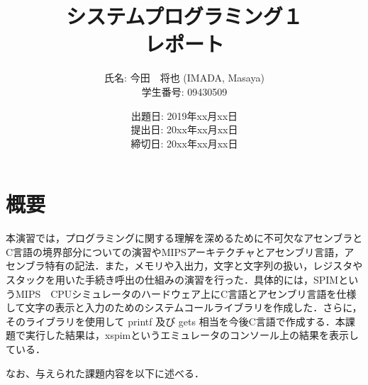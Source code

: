 \documentclass[a4j,11pt]{jarticle}
\title{システムプログラミング１ \\
       レポート}
\author{氏名: 今田　将也 (IMADA, Masaya) \\
        学生番号: 09430509}
\date{出題日: 2019年xx月xx日 \\
      提出日: 20xx年xx月xx日 \\
      締切日: 20xx年xx月xx日 \\}  %
\begin{document}
\maketitle


\section{概要} \label{chap:abstract}

本演習では，プログラミングに関する理解を深めるために不可欠なアセンブラとC言語の境界部分についての演習やMIPSアーキテクチャとアセンブリ言語，アセンブラ特有の記法．また，メモリや入出力，文字と文字列の扱い，レジスタやスタックを用いた手続き呼出の仕組みの演習を行った．具体的には，SPIMというMIPS　CPUシミュレータのハードウェア上にC言語とアセンブリ言語を仕様して文字の表示と入力のためのシステムコールライブラリを作成した．さらに，そのライブラリを使用して printf 及び gets 相当を今後C言語で作成する．本課題で実行した結果は，xspimというエミュレータのコンソール上の結果を表示している．

なお、与えられた課題内容を以下に述べる．
\end{document}
